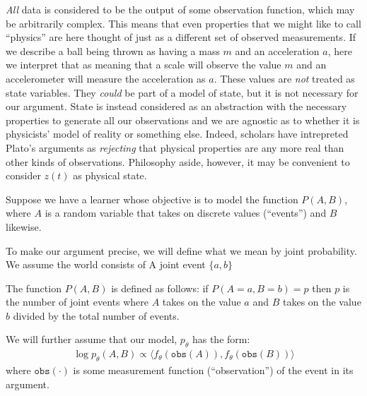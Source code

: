 \textit{All} data is considered to be the output of some observation function, which may be arbitrarily complex. This means that even properties that we might like to call ``physics'' are here thought of just as a different set of observed measurements. If we describe a ball being thrown as having a mass $m$ and an acceleration $a$, here we interpret that as meaning that a scale will observe the value $m$ and an accelerometer will measure the acceleration as $a$. These values are \textit{not} treated as state variables. They \textit{could} be part of a model of state, but it is not necessary for our argument. State is instead considered as an abstraction with the necessary properties to generate all our observations and we are agnostic as to whether it is physicists' model of reality or something else. Indeed, scholars have intrepreted Plato's arguments as \textit{rejecting} that physical properties are any more real than other kinds of observations. Philosophy aside, however, it may be convenient to consider $z(t)$ as physical state.


Suppose we have a learner whose objective is to model the function $P(A,B)$, where $A$ is a random variable that takes on discrete values (``events'') and $B$ likewise. 

To make our argument precise, we will define what we mean by joint probability. We assume the world consists of A joint event $\{a,b\}$ 

The function $P(A,B)$ is defined as follows: if $P(A=a, B=b) = p$ then $p$ is the number of joint events where $A$ takes on the value $a$ and $B$ takes on the value $b$ divided by the total number of events.

We will further assume that our model, $p_{\theta}$ has the form:
\begin{align}
    \log p_{\theta}(A,B) \propto \langle f_{\theta}(\texttt{obs}(A)), f_{\theta}(\texttt{obs}(B)) \rangle
\end{align}
where $\texttt{obs}(\cdot)$ is some measurement function (``observation'') of the event in its argument.






